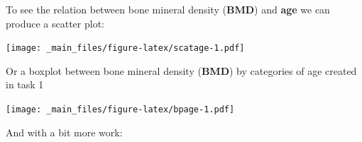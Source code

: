 \documentclass[
]{book}
\newenvironment{Shaded}{\begin{snugshade}}{\end{snugshade}}
\newcommand{\CommentTok}[1]{\textcolor[rgb]{0.56,0.35,0.01}{\textit{#1}}}
\newcommand{\FunctionTok}[1]{\textcolor[rgb]{0.13,0.29,0.53}{\textbf{#1}}}
\newcommand{\NormalTok}[1]{#1}
\newcommand{\SpecialCharTok}[1]{\textcolor[rgb]{0.81,0.36,0.00}{\textbf{#1}}}
\begin{document}
To see the relation between bone mineral density (\textbf{BMD}) and \textbf{age} we
can produce a scatter plot:

\begin{Shaded}
\end{Shaded}

\texttt{[image: \_main\_files/figure-latex/scatage-1.pdf]}

Or a boxplot between bone mineral density (\textbf{BMD}) by categories of age created
in task 1

\begin{Shaded}
\end{Shaded}

\texttt{[image: \_main\_files/figure-latex/bpage-1.pdf]}

And with a bit more work:
\end{document}
